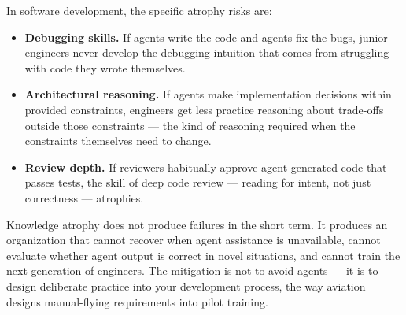 \documentclass[
  a4paper,
  DIV=11,
  numbers=noendperiod]{scrreprt}
\providecommand{\tightlist}{%
  \setlength{\itemsep}{0pt}\setlength{\parskip}{0pt}}
\begin{document}
In software development, the specific atrophy risks are:

\begin{itemize}
\tightlist
\item
  \textbf{Debugging skills.} If agents write the code and agents fix the
  bugs, junior engineers never develop the debugging intuition that
  comes from struggling with code they wrote themselves.
\item
  \textbf{Architectural reasoning.} If agents make implementation
  decisions within provided constraints, engineers get less practice
  reasoning about trade-offs outside those constraints --- the kind of
  reasoning required when the constraints themselves need to change.
\item
  \textbf{Review depth.} If reviewers habitually approve agent-generated
  code that passes tests, the skill of deep code review --- reading for
  intent, not just correctness --- atrophies.
\end{itemize}

Knowledge atrophy does not produce failures in the short term. It
produces an organization that cannot recover when agent assistance is
unavailable, cannot evaluate whether agent output is correct in novel
situations, and cannot train the next generation of engineers. The
mitigation is not to avoid agents --- it is to design deliberate
practice into your development process, the way aviation designs
manual-flying requirements into pilot training.
\end{document}
